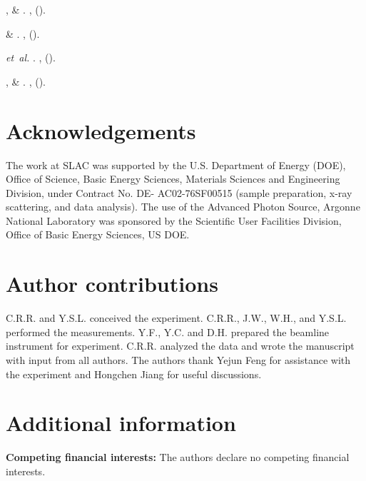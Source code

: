 \documentclass[preprint,superscriptaddress,amsmath,amssymb,aps,prl]{revtex4-1}
\begin{document}
\begin{thebibliography}{10}
, 
   \& 
\newblock {}.
\newblock \emph{}
  \textbf{}, 
  ().

 \& 
\newblock {}.
\newblock \emph{}
  \textbf{},  ().

 \emph{et~al.}
\newblock {}.
\newblock \emph{}
  \textbf{},  ().

 , 
   \& 
\newblock {}.
\newblock \emph{}
  \textbf{},  ().

\end{thebibliography}

\section*{Acknowledgements}
The work at SLAC was supported by the U.S. Department of Energy (DOE), Office of Science, Basic Energy Sciences, Materials Sciences and Engineering Division, under Contract No. DE- AC02-76SF00515 (sample preparation, x-ray scattering, and data analysis). The use of the Advanced Photon Source, Argonne National Laboratory was sponsored by the Scientific User Facilities Division, Office of Basic Energy Sciences, US DOE.

\section*{Author contributions}
C.R.R. and Y.S.L. conceived the experiment. C.R.R., J.W., W.H., and Y.S.L. performed the measurements. Y.F., Y.C. and D.H. prepared the beamline instrument for experiment. C.R.R. analyzed the data and wrote the manuscript with input from all authors. The authors thank Yejun Feng for assistance with the experiment and Hongchen Jiang for useful discussions.

\section*{Additional information}
\textbf{Competing financial interests:} The authors declare no competing financial interests.
\end{document}
